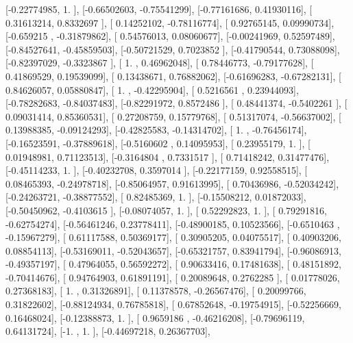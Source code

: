 \documentclass{article}
\begin{document}
       [-0.22774985,  1.        ],
       [-0.66502603, -0.75541299],
       [-0.77161686,  0.41930116],
       [ 0.31613214,  0.8332697 ],
       [ 0.14252102, -0.78116774],
       [ 0.92765145,  0.09990734],
       [-0.659215  , -0.31879862],
       [ 0.54576013,  0.08060677],
       [-0.00241969,  0.52597489],
       [-0.84527641, -0.45859503],
       [-0.50721529,  0.7023852 ],
       [-0.41790544,  0.73088098],
       [-0.82397029, -0.3323867 ],
       [ 1.        ,  0.46962048],
       [ 0.78446773, -0.79177628],
       [ 0.41869529,  0.19539099],
       [ 0.13438671,  0.76882062],
       [-0.61696283, -0.67282131],
       [ 0.84626057,  0.05880847],
       [ 1.        , -0.42295904],
       [ 0.5216561 ,  0.23944093],
       [-0.78282683, -0.84037483],
       [-0.82291972,  0.8572486 ],
       [ 0.48441374, -0.5402261 ],
       [ 0.09031414,  0.85360531],
       [ 0.27208759,  0.15779768],
       [ 0.51317074, -0.56637002],
       [ 0.13988385, -0.09124293],
       [-0.42825583, -0.14314702],
       [ 1.        , -0.76456174],
       [-0.16523591, -0.37889618],
       [-0.5160602 ,  0.14095953],
       [ 0.23955179,  1.        ],
       [ 0.01948981,  0.71123513],
       [-0.3164804 ,  0.7331517 ],
       [ 0.71418242,  0.31477476],
       [-0.45114233,  1.        ],
       [-0.40232708,  0.3597014 ],
       [-0.22177159,  0.92558515],
       [ 0.08465393, -0.24978718],
       [-0.85064957,  0.91613995],
       [ 0.70436986, -0.52034242],
       [-0.24263721, -0.38877552],
       [ 0.82485369,  1.        ],
       [-0.15508212,  0.01872033],
       [-0.50450962, -0.4103615 ],
       [-0.08074057,  1.        ],
       [ 0.52292823,  1.        ],
       [ 0.79291816, -0.62754274],
       [-0.56461246,  0.23778411],
       [-0.48900185,  0.10523566],
       [-0.6510463 , -0.15967279],
       [ 0.61117588,  0.50369177],
       [ 0.30905205,  0.04075517],
       [ 0.40903206,  0.08854113],
       [-0.53169011, -0.52043657],
       [-0.65321757,  0.83941794],
       [-0.96086913, -0.49357197],
       [ 0.47964055,  0.56592272],
       [ 0.90633416,  0.17481638],
       [ 0.48151892, -0.70414676],
       [ 0.94764903,  0.61891191],
       [ 0.20089648,  0.2762285 ],
       [ 0.01778026,  0.27368183],
       [ 1.        ,  0.31326891],
       [ 0.11378578, -0.26567476],
       [ 0.20099766,  0.31822602],
       [-0.88124934,  0.76785818],
       [ 0.67852648, -0.19754915],
       [-0.52256669,  0.16468024],
       [-0.12388873,  1.        ],
       [ 0.9659186 , -0.46216208],
       [-0.79696119,  0.64131724],
       [-1.        ,  1.        ],
       [-0.44697218,  0.26367703],
\end{document}
